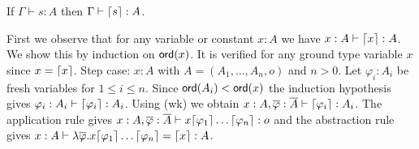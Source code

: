 
\begin{lemma}
\label{lem:elnf_preserves_safety}
If $\Gamma \vdash s :A$ then $\Gamma \vdash \lceil s\rceil :A$.
\end{lemma}
\proof

 First we observe that for any variable or constant $x:A$ we have $x:A \vdash \lceil x\rceil :A$. We show this by induction on ${\sf ord}(x)$.
It is verified for any ground type variable $x$
since $x = \lceil x\rceil$.
Step case: $x:A$ with $A=(A_1, \ldots, A_n,o)$ and $n>0$. Let $\varphi_i:A_i$ be fresh variables for $1\leq i\leq n$.
Since ${\sf ord}(A_i) < {\sf ord}(x)$ the induction hypothesis gives $\varphi_i :A_i \vdash \lceil \varphi_i\rceil : A_i$. Using {\sf(wk)} we obtain $x:A, \overline{\varphi} : \overline{A}
  \vdash \lceil \varphi_i\rceil :A_i$.  The application rule gives $x :A, \overline{\varphi} : \overline{A} \vdash x \lceil \varphi_1\rceil \ldots \lceil \varphi_n\rceil
  : o$ and the abstraction rule gives $ x :A \vdash \lambda
  \overline{\varphi} . x \lceil \varphi_1\rceil \ldots \lceil \varphi_n\rceil =
  \lceil x\rceil :A$.


